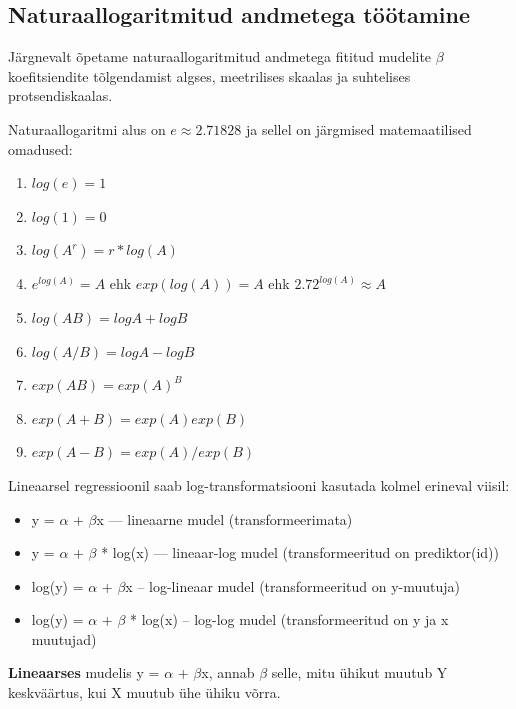 \documentclass[]{book}
\begin{document}
\subsection*{Naturaallogaritmitud andmetega
töötamine}\label{naturaallogaritmitud-andmetega-tootamine}

Järgnevalt õpetame naturaallogaritmitud andmetega fititud mudelite
\(\beta\) koefitsiendite tõlgendamist algses, meetrilises skaalas ja
suhtelises protsendiskaalas.

Naturaallogaritmi alus on \(e \approx 2.71828\) ja sellel on järgmised
matemaatilised omadused:

\begin{enumerate}
\def\labelenumi{\arabic{enumi}.}
\item
  \(log(e) = 1\)
\item
  \(log(1) = 0\)
\item
  \(log(A^r) = r * log(A)\)
\item
  \(e^{log(A)} = A\) ehk \(exp(log(A)) = A\) ehk
  \(2.72^{log(A)} \approx A\)
\item
  \(log(AB)=logA + logB\)
\item
  \(log(A/B)=logA - logB\)
\item
  \(exp(AB) = exp(A)^B\)
\item
  \(exp(A+B) = exp(A)exp(B)\)
\item
  \(exp(A-B) = exp(A)/exp(B)\)
\end{enumerate}

Lineaarsel regressioonil saab log-transformatsiooni kasutada kolmel
erineval viisil:

\begin{itemize}
\item
  y = \(\alpha\) + \(\beta\)x --- lineaarne mudel (transformeerimata)
\item
  y = \(\alpha\) + \(\beta\) * log(x) --- lineaar-log mudel
  (transformeeritud on prediktor(id))
\item
  log(y) = \(\alpha\) + \(\beta\)x -- log-lineaar mudel
  (transformeeritud on y-muutuja)
\item
  log(y) = \(\alpha\) + \(\beta\) * log(x) -- log-log mudel
  (transformeeritud on y ja x muutujad)
\end{itemize}

\textbf{Lineaarses} mudelis y = \(\alpha\) + \(\beta\)x, annab \(\beta\)
selle, mitu ühikut muutub Y keskväärtus, kui X muutub ühe ühiku võrra.
\end{document}
